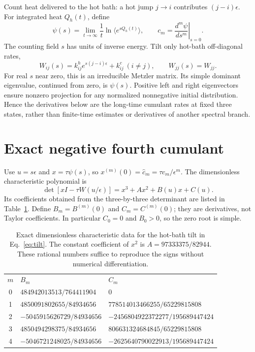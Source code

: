 \documentclass[aps,pre,10pt,onecolumn,notitlepage,longbibliography,amsmath,amssymb]{revtex4-2}
\begin{document}
Count heat delivered to the hot bath: a hot jump $j\to i$ contributes $(j-i)\epsilon$. For integrated heat $Q_h(t)$, define
\begin{equation}
 \psi(s)=\lim_{t\to\infty}\frac{1}{t}\ln\langle e^{sQ_h(t)}\rangle,
 \qquad c_m=\left.\frac{d^m\psi}{ds^m}\right|_{s=0}.
\end{equation}
The counting field $s$ has units of inverse energy. Tilt only hot-bath off-diagonal rates,
\begin{equation}\label{eq:tilt}
 W_{ij}(s)=k^h_{ij}e^{s(j-i)\epsilon}+k^c_{ij}\ (i\ne j),
 \qquad W_{jj}(s)=W_{jj}.
\end{equation}
For real $s$ near zero, this is an irreducible Metzler matrix. Its simple dominant eigenvalue, continued from zero, is $\psi(s)$. Positive left and right eigenvectors ensure nonzero projection for any normalized nonnegative initial distribution. Hence the derivatives below are the long-time cumulant rates at fixed three states, rather than finite-time estimates or derivatives of another spectral branch.

\section{Exact negative fourth cumulant}
Use $u=s\epsilon$ and $x=\tau\psi(s)$, so $x^{(m)}(0)=\widehat c_m=\tau c_m/\epsilon^m$. The dimensionless characteristic polynomial is
\begin{equation}\label{eq:poly}
 \det[xI-\tau W(u/\epsilon)]
 =x^3+Ax^2+B(u)x+C(u).
\end{equation}
Its coefficients obtained from the three-by-three determinant are listed in Table~\ref{tab:coefficients}. Define $B_m=B^{(m)}(0)$ and $C_m=C^{(m)}(0)$; they are derivatives, not Taylor coefficients. In particular $C_0=0$ and $B_0>0$, so the zero root is simple.
\begin{table}[ht]
\caption{Exact dimensionless characteristic data for the hot-bath tilt in Eq.~\eqref{eq:tilt}. The constant coefficient of $x^2$ is $A=97333375/82944$. These rational numbers suffice to reproduce the signs without numerical differentiation.}\label{tab:coefficients}
\begin{ruledtabular}
\begin{tabular}{cll}
 $m$&$B_m$&$C_m$\\
 0&$484942013513/764411904$&$0$\\
 1&$4850091802655/84934656$&$778514013466255/65229815808$\\
 2&$-5045915626729/84934656$&$-2456804922372277/195689447424$\\
 3&$4850494298375/84934656$&$806631324684845/65229815808$\\
 4&$-5046721248025/84934656$&$-2625640790022913/195689447424$
\end{tabular}
\end{ruledtabular}
\end{table}
\end{document}
